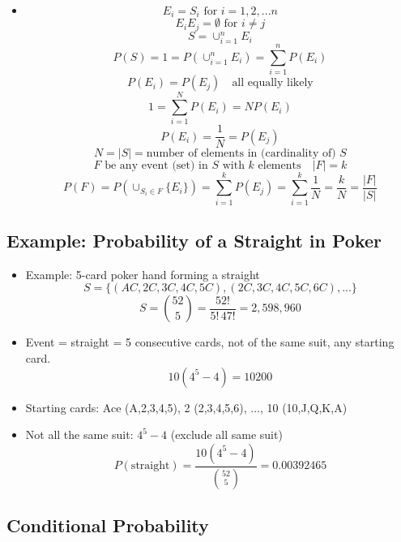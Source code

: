 \begin{itemize}
      \item \[ E_i = S_i \text{ for } i = 1, 2, ... n \]
            \[ E_i E_j = \emptyset \text{ for } i \neq j \]
            \[ S = \cup_{i=1}^{n} E_i \]
            \[ P(S) = 1 = P(\cup_{i=1}^{n} E_i) = \sum_{i=1}^{n} P(E_i) \]
            \[ P (E_i) = P(E_j) \quad \text{all equally likely} \]
            \[ 1 = \sum_{i=1}^{N} P(E_i) = N P(E_i) \]
            \[ P(E_i) = \frac{1}{N} = P(E_j) \]
            \[ N = |S| = \text{number of elements in (cardinality of) } S \]
            \[ F \text{ be any event (set) in } S \text{ with } k \text{ elements} \quad |F| = k \]
            \[ P(F) = P(\cup_{S_i \in F} \{E_i\}) = \sum_{i=1}^{k} P(E_j) = \sum_{i=1}^{k} \frac{1}{N} = \frac{k}{N} = \frac{|F|}{|S|} \]
\end{itemize}

\subsection{Example: Probability of a Straight in Poker}

\begin{itemize}
      \item Example: 5-card poker hand forming a straight
            \[ S = \{ (AC, 2C, 3C, 4C, 5C), (2C, 3C, 4C, 5C, 6C), ...\} \]
            \[ S = \binom{52}{5} = \frac{52!}{5! \, 47!} = 2,598,960 \]
      \item Event = straight = 5 consecutive cards, not of the same suit, any starting card.
            \[ 10 ( 4^5 - 4) = 10200 \]
      \item Starting cards: Ace (A,2,3,4,5), 2 (2,3,4,5,6), ..., 10 (10,J,Q,K,A)
      \item Not all the same suit: $4^5 - 4$ (exclude all same suit)
            \[ P (\text{straight}) = \frac{10(4^5 - 4)}{\binom{52}{5}} = 0.00392465 \]
\end{itemize}

\subsection{Conditional Probability}

